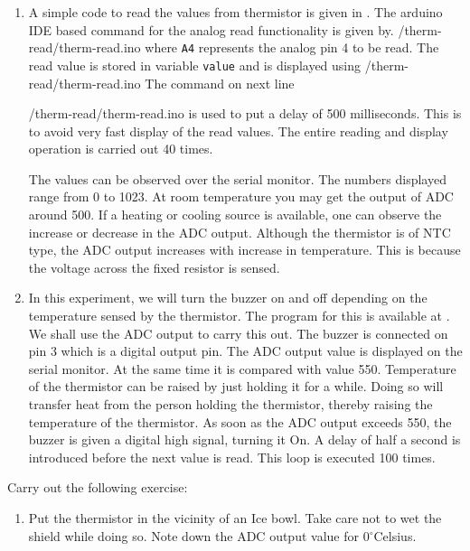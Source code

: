 \begin{enumerate}
\item A simple code to read the values from thermistor is given in . The arduino IDE based command for the analog read functionality is given by.
  {\LocTHERMardcode/therm-read/therm-read.ino} 
where {\tt A4} represents the analog pin 4 to be read. The read value is stored in variable {\tt value} and is displayed using   {\LocTHERMardcode/therm-read/therm-read.ino} 
The command on next line

  {\LocTHERMardcode/therm-read/therm-read.ino} 
 is used to put a delay of 500 milliseconds. This is to avoid very fast display of the read values. The entire reading and display operation is carried out 40 times.

The values can be observed over the serial monitor. The numbers
displayed range from 0 to 1023. At room temperature you may get the
output of ADC around 500. If a heating or cooling source is available,
one can observe the increase or decrease in the ADC output. Although
the thermistor is of NTC type, the ADC output increases with increase
in temperature. This is because the voltage across the fixed resistor
is sensed. 

\item In this experiment, we will turn the buzzer on and off depending
  on the temperature sensed by the thermistor. The program for this is
  available at . We shall use the ADC output
  to carry this out. The buzzer is connected on pin 3 which is a
  digital output pin. The ADC output value is displayed on the serial
  monitor. At the same time it is compared with value 550. Temperature
  of the thermistor can be raised by just holding it for a
  while. Doing so will transfer heat from the person holding the
  thermistor, thereby raising the temperature of the thermistor. As
  soon as the ADC output exceeds 550, the buzzer is given a digital
  high signal, turning it On. A delay of half a second is introduced
  before the next value is read. This loop is executed 100 times. 
\end{enumerate}

\begin{exercise}
Carry out the following exercise:
\begin{enumerate}
\item Put the thermistor in the vicinity of an Ice bowl. Take care not
  to wet the shield while doing so. Note down the ADC output value for
  0$^{\circ}$Celsius. 
\end{enumerate}
\end{exercise}


